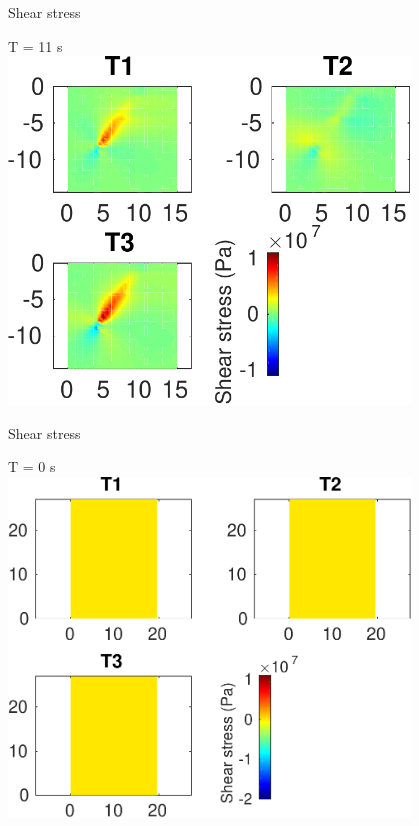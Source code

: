 \documentclass{beamer}
\begin{document}
\begin{frame}
 {Shear stress}
 
 \centering \Large T = 11 s\\
 \includegraphics[width=0.8\textwidth]{images/vertical_00116}
 
\end{frame}



\begin{frame}
 {Shear stress}
 
 \centering \Large T = 0 s\\
 \includegraphics[width=0.8\textwidth]{images/horizontal_00006}
 
\end{frame}
\end{document}
